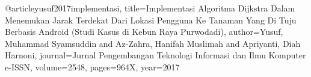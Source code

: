 @article{yusuf2017implementasi,
  title={Implementasi Algoritma Dijkstra Dalam Menemukan Jarak Terdekat Dari Lokasi Pengguna Ke Tanaman Yang Di Tuju Berbasis Android (Studi Kasus di Kebun Raya Purwodadi)},
  author={Yusuf, Muhammad Syamsuddin and Az-Zahra, Hanifah Muslimah and Apriyanti, Diah Harnoni},
  journal={Jurnal Pengembangan Teknologi Informasi dan Ilmu Komputer e-ISSN},
  volume={2548},
  pages={964X},
  year={2017}
}